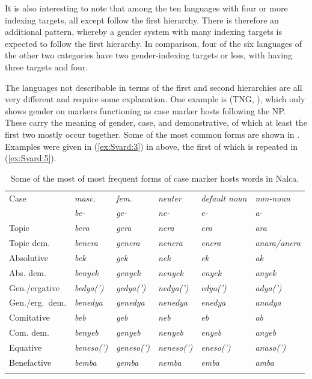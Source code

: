 \documentclass[output=collectionpaper]{langsci/langscibook}
\begin{document}
It is also interesting to note that among the ten languages with four or more indexing targets, all except  follow the first hierarchy. There is therefore an additional pattern, whereby a gender system with many indexing targets is expected to follow the first hierarchy. In comparison, four of the six languages of the other two categories have two gender-indexing targets or less, with  having three targets and  four.


The languages not describable in terms of the first and second hierarchies are all very different and require some explanation. One example is  (TNG, ), which only shows gender on markers functioning as case marker hosts following the NP. These carry the meaning of gender, case, and demonstrative, of which at least the first two mostly occur together. Some of the most common forms are shown in . Examples were given in (\ref{ex:Svard:3}) in  above, the first of which is repeated in (\ref{ex:Svard:5}).


\begin{table}
\begin{tabularx}{\textwidth}{X>{\itshape}l>{\itshape}l>{\itshape}l>{\itshape}l>{\itshape}l}
\lsptoprule

Case & \normalfont masc. & \normalfont fem. & \normalfont neuter  & \normalfont default noun  & \normalfont non-noun \\
 & be- & ge- & ne- & e- & a- \\
\midrule
Topic & bera & gera & nera & era & ara\\
Topic dem. & benera & genera & nenera & enera & anara/anera\\
Absolutive & bek & gek & nek & ek & ak\\
Abs. dem. & benyek & genyek & nenyek & enyek & anyek\\
Gen./ergative & bedya(') & gedya(') & nedya(') & edya(') & adya(')\\
Gen./erg.~dem. & benedya & genedya & nenedya & enedya & anadya\\
Comitative & beb & geb & neb & eb & ab\\
Com. dem. & benyeb & genyeb & nenyeb & enyeb & anyeb\\
Equative & beneso(') & geneso(') & neneso(') & eneso(') & anaso(')\\
Benefactive & bemba & gemba & nemba & emba & amba\\
\lspbottomrule
\end{tabularx}
\caption{Some of the most of most frequent forms of case marker hosts words in Nalca.}
\label{tab:Svard:9}
\end{table}
\end{document}
